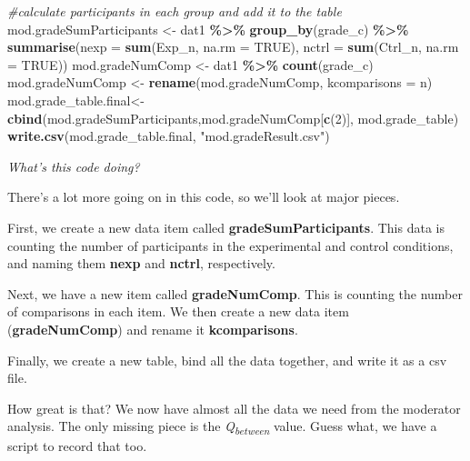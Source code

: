 \documentclass[
]{book}
\newenvironment{Shaded}{\begin{snugshade}}{\end{snugshade}}
\newcommand{\AttributeTok}[1]{\textcolor[rgb]{0.13,0.29,0.53}{#1}}
\newcommand{\CommentTok}[1]{\textcolor[rgb]{0.56,0.35,0.01}{\textit{#1}}}
\newcommand{\ConstantTok}[1]{\textcolor[rgb]{0.56,0.35,0.01}{#1}}
\newcommand{\DecValTok}[1]{\textcolor[rgb]{0.00,0.00,0.81}{#1}}
\newcommand{\FunctionTok}[1]{\textcolor[rgb]{0.13,0.29,0.53}{\textbf{#1}}}
\newcommand{\NormalTok}[1]{#1}
\newcommand{\OtherTok}[1]{\textcolor[rgb]{0.56,0.35,0.01}{#1}}
\newcommand{\SpecialCharTok}[1]{\textcolor[rgb]{0.81,0.36,0.00}{\textbf{#1}}}
\newcommand{\StringTok}[1]{\textcolor[rgb]{0.31,0.60,0.02}{#1}}
\begin{document}
\begin{Shaded}
\begin{Highlighting}[]
\CommentTok{\#calculate participants in each group and add it to the table}
\NormalTok{mod.gradeSumParticipants }\OtherTok{\textless{}{-}}\NormalTok{ dat1 }\SpecialCharTok{\%\textgreater{}\%}
  \FunctionTok{group\_by}\NormalTok{(grade\_c) }\SpecialCharTok{\%\textgreater{}\%}
  \FunctionTok{summarise}\NormalTok{(}\AttributeTok{nexp =} \FunctionTok{sum}\NormalTok{(Exp\_n, }\AttributeTok{na.rm =} \ConstantTok{TRUE}\NormalTok{),}
            \AttributeTok{nctrl =} \FunctionTok{sum}\NormalTok{(Ctrl\_n, }\AttributeTok{na.rm =} \ConstantTok{TRUE}\NormalTok{))}
\NormalTok{mod.gradeNumComp }\OtherTok{\textless{}{-}}\NormalTok{ dat1 }\SpecialCharTok{\%\textgreater{}\%}
  \FunctionTok{count}\NormalTok{(grade\_c)}
\NormalTok{mod.gradeNumComp }\OtherTok{\textless{}{-}} \FunctionTok{rename}\NormalTok{(mod.gradeNumComp, }\AttributeTok{kcomparisons =}\NormalTok{ n)}
\NormalTok{mod.grade\_table.final}\OtherTok{\textless{}{-}} \FunctionTok{cbind}\NormalTok{(mod.gradeSumParticipants,mod.gradeNumComp[}\FunctionTok{c}\NormalTok{(}\DecValTok{2}\NormalTok{)], mod.grade\_table) }
\FunctionTok{write.csv}\NormalTok{(mod.grade\_table.final, }\StringTok{"mod.gradeResult.csv"}\NormalTok{)}
\end{Highlighting}
\end{Shaded}

\emph{What's this code doing?}

There's a lot more going on in this code, so we'll look at major pieces.

First, we create a new data item called \textbf{gradeSumParticipants}. This data is counting the number of participants in the experimental and control conditions, and naming them \textbf{nexp} and \textbf{nctrl}, respectively.

Next, we have a new item called \textbf{gradeNumComp}. This is counting the number of comparisons in each item. We then create a new data item (\textbf{gradeNumComp}) and rename it \textbf{kcomparisons}.

Finally, we create a new table, bind all the data together, and write it as a csv file.

How great is that? We now have almost all the data we need from the moderator analysis. The only missing piece is the \emph{Q\textsubscript{between}} value. Guess what, we have a script to record that too.
\end{document}
